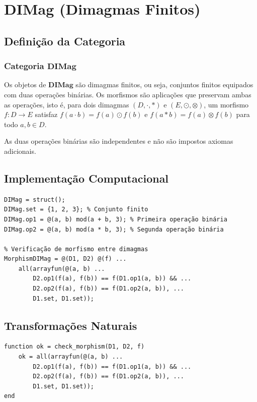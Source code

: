 \section{DIMag (Dimagmas Finitos)}
\label{sec:dimag}

\subsection{Definição da Categoria}

\subsubsection{Categoria $\mathbf{DIMag}$}

\begin{definition}
    Os objetos de $\mathbf{DIMag}$ são dimagmas finitos, ou seja, conjuntos finitos equipados com duas operações binárias.
    Os morfismos são aplicações que preservam ambas as operações, isto é, para dois dimagmas $(D, \cdot, \ast)$ e $(E, \odot, \otimes)$, um morfismo $f: D \to E$ satisfaz $f(a \cdot b) = f(a) \odot f(b)$ e $f(a \ast b) = f(a) \otimes f(b)$ para todo $a, b \in D$.
\end{definition}

\begin{remark}
    As duas operações binárias são independentes e não são impostos axiomas adicionais.
\end{remark}

\subsection{Implementação Computacional}

\begin{lstlisting}[style=matlab]
% Definição de um dimagma
DIMag = struct();
DIMag.set = {1, 2, 3}; % Conjunto finito
DIMag.op1 = @(a, b) mod(a + b, 3); % Primeira operação binária
DIMag.op2 = @(a, b) mod(a * b, 3); % Segunda operação binária

% Verificação de morfismo entre dimagmas
MorphismDIMag = @(D1, D2) @(f) ...
    all(arrayfun(@(a, b) ...
        D2.op1(f(a), f(b)) == f(D1.op1(a, b)) && ...
        D2.op2(f(a), f(b)) == f(D1.op2(a, b)), ...
        D1.set, D1.set));
\end{lstlisting}

\subsection{Transformações Naturais}
\begin{lstlisting}[style=matlab]
function ok = check_morphism(D1, D2, f)
    ok = all(arrayfun(@(a, b) ...
        D2.op1(f(a), f(b)) == f(D1.op1(a, b)) && ...
        D2.op2(f(a), f(b)) == f(D1.op2(a, b)), ...
        D1.set, D1.set));
end
\end{lstlisting}